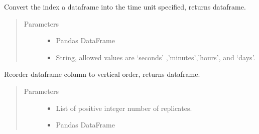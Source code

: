 \documentclass[letterpaper,10pt,english]{sphinxmanual}
\begin{document}

\begin{fulllineitems}
\label{\detokenize{platelib:platelib.plateread.to_time_units}}
Convert the index a dataframe into the time unit specified, returns dataframe.
\begin{quote}\begin{description}
\item[{Parameters}] \leavevmode\begin{itemize}
\item {} 
 \textendash{} Pandas DataFrame

\item {} 
 \textendash{} String, allowed values are ‘seconds’ ,’minutes’,’hours’, and ‘days’.

\end{itemize}

\end{description}\end{quote}

\end{fulllineitems}


\begin{fulllineitems}
\label{\detokenize{platelib:platelib.plateread.vert_order}}
Reorder dataframe column to vertical order, returns dataframe.
\begin{quote}\begin{description}
\item[{Parameters}] \leavevmode\begin{itemize}
\item {} 
 \textendash{} List of positive integer number of replicates.

\item {} 
 \textendash{} Pandas DataFrame

\end{itemize}

\end{description}\end{quote}

\end{fulllineitems}
\end{document}

